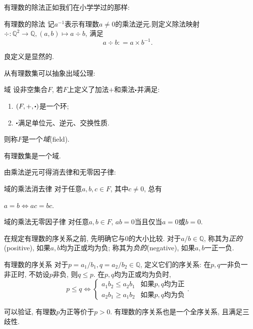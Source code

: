 有理数的除法正如我们在小学学过的那样: 

\begin{definition}{有理数的除法}
	记$a^{-1}$表示有理数$a\neq 0$的乘法逆元.则定义除法映射$\div : \mathbb{Q} ^2 \to \mathbb{Q} , (a, b) \mapsto a \div b$, 满足$$a \div b: =a\times b^{-1}.$$
\end{definition}

良定义是显然的.

从有理数集可以抽象出域公理: 

\begin{axiom}{域}
	设非空集合$F$, 若$F$上定义了加法$+$和乘法$\bigcdot$并满足: 
	\begin{enumerate}
		\item $(F,+,\bigcdot)$是一个环; 
		\item $\bigcdot$满足单位元、逆元、交换性质.
	\end{enumerate}
	则称$F$是一个\textit{域}(field).
\end{axiom}

有理数集是一个域.

由乘法逆元可得消去律和无零因子律: 

\begin{proposition}{域的乘法消去律}
	对于任意$a, b, c \in F$, 其中$c \neq 0$, 总有
	\begin{center}
		$a=b \Leftrightarrow ac=bc.$
	\end{center}
\end{proposition}

\begin{corollary}{域的乘法无零因子律}
	对任意$a, b \in F$, $ab=0$当且仅当$a=0$或$b=0$.
\end{corollary}

在规定有理数的序关系之前, 先明确它与$0$的大小比较. 对于$a/b \in \mathbb{Q}$, 称其为\textit{正的}(positive), 如果$a, b$均为正或均为负; 称其为\textit{负的}(negative), 如果$a, b$一正一负. 

\begin{definition}{有理数的序关系}
	对于$p=a_1/b_1, q=a_2/b_2 \in \mathbb{Q}$, 定义它们的序关系: 在$p, q$一非负一非正时, 不妨设$p$非负, 则$q \leq p$. 在$p, q$均为正或均为负时, 
	$$p \leq q \Leftrightarrow \begin{cases}
		a_1b_2 \leq a_2b_1 & \textit{如果$p, q$均为正} \\
		a_2b_1 \geq a_1b_2 & \textit{如果$p, q$均为负}
	\end{cases}.$$
\end{definition}

可以验证, 有理数$p$为正等价于$p>0$. 有理数的序关系也是一个全序关系, 且满足三歧性.

